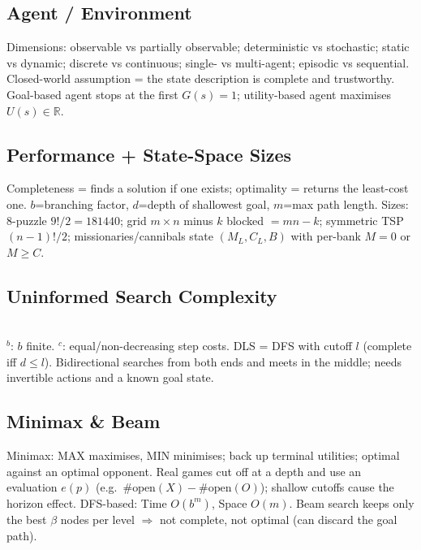 \subsection*{Agent / Environment}
Dimensions: observable vs partially observable; deterministic vs stochastic; static vs dynamic; discrete vs continuous; single- vs multi-agent; episodic vs sequential. Closed-world assumption = the state description is complete and trustworthy. Goal-based agent stops at the first \(G(s){=}1\); utility-based agent maximises \(U(s)\in\mathbb{R}\).

\subsection*{Performance + State-Space Sizes}
Completeness = finds a solution if one exists; optimality = returns the least-cost one. \(b\)=branching factor, \(d\)=depth of shallowest goal, \(m\)=max path length. Sizes: 8-puzzle \(9!/2{=}181440\); grid \(m\times n\) minus \(k\) blocked \(=mn{-}k\); symmetric TSP \((n{-}1)!/2\); missionaries/cannibals state \((M_L,C_L,B)\) with per-bank \(M{=}0\) or \(M\ge C\).

\subsection*{Uninformed Search Complexity}
\\
\(^b\): \(b\) finite. \(^c\): equal/non-decreasing step costs. DLS = DFS with cutoff \(l\) (complete iff \(d\le l\)). Bidirectional searches from both ends and meets in the middle; needs invertible actions and a known goal state.

\subsection*{Minimax \& Beam}
Minimax: MAX maximises, MIN minimises; back up terminal utilities; optimal against an optimal opponent. Real games cut off at a depth and use an evaluation \(e(p)\) (e.g.\ \(\#\text{open}(X){-}\#\text{open}(O)\)); shallow cutoffs cause the horizon effect. DFS-based: Time \(O(b^m)\), Space \(O(m)\). Beam search keeps only the best \(\beta\) nodes per level \(\Rightarrow\) not complete, not optimal (can discard the goal path).

